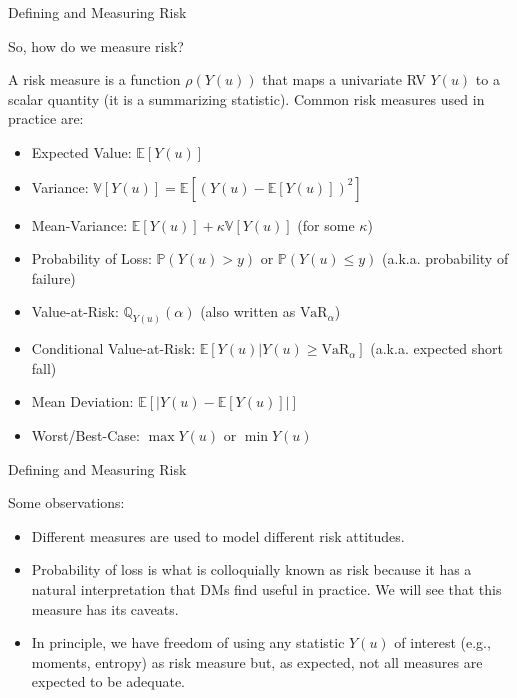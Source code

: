 \documentclass[9pt]{beamer}
\begin{document}
%
\begin{frame}{Defining and Measuring Risk}
\begin{block}{}
So, how do we measure risk? 
\end{block}

A risk measure is a function $\rho(Y(u))$ that maps a univariate RV $Y(u)$ to a scalar quantity (it is a summarizing statistic). Common risk measures used in practice are:
\begin{itemize}
\item Expected Value: $\mathbb{E}[Y(u)]$
\item Variance: $\mathbb{V}[Y(u)]=\mathbb{E}[(Y(u)-\mathbb{E}[Y(u)])^2]$
\item Mean-Variance: $\mathbb{E}[Y(u)]+\kappa \mathbb{V}[Y(u)]$ (for some $\kappa$)
\item Probability of Loss: $\mathbb{P}(Y(u)>y)$ or $\mathbb{P}(Y(u)\leq y)$ (a.k.a. probability of failure)
\item Value-at-Risk: $\mathbb{Q}_{Y(u)}(\alpha)$ (also written as $\textrm{VaR}_\alpha$)
\item Conditional Value-at-Risk: $\mathbb{E}[Y(u)|Y(u)\geq \textrm{VaR}_\alpha]$ (a.k.a. expected short fall) 
\item Mean Deviation:  $\mathbb{E}[|Y(u)-\mathbb{E}[Y(u)]|]$
\item Worst/Best-Case: $\max Y(u)$ or $\min Y(u)$
\end{itemize}

\end{frame}

%
\begin{frame}{Defining and Measuring Risk}

Some observations:
\begin{itemize}
\item Different measures are used to model different risk attitudes. 

\item Probability of loss is what is colloquially known as risk because it has a natural interpretation that DMs find useful in practice. We will see that this measure has its caveats. 

\item In principle, we have freedom of using any statistic $Y(u)$ of interest (e.g., moments, entropy) as risk measure but, as expected, not all measures are expected to be adequate.   
\end{itemize}

\end{frame}
\end{document}
